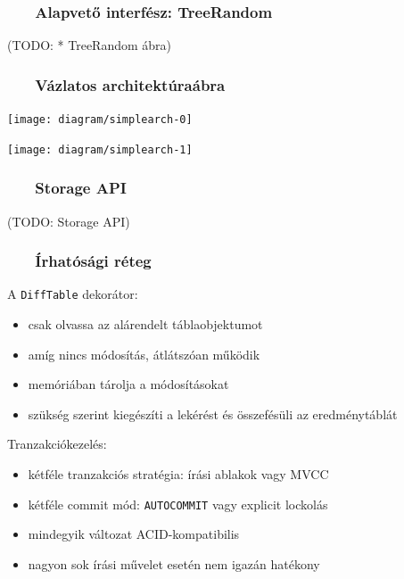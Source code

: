 \documentclass[
]{beamer}
\newcommand{\slidetitle}[2]{\frametitle{{\small #1 ~ \ding{226} ~ } \normalsize \textbf{#2} }}
\begin{document}
\begin{frame}
    \slidetitle{\sectionshorttitle}{Alapvető interfész: TreeRandom}
    
   (TODO: * TreeRandom ábra)
\end{frame}

\begin{frame}
    \slidetitle{\sectionshorttitle}{Vázlatos architektúraábra}
    
    \centering
    
    \begin{overprint}
        \centerline{\texttt{[image: diagram/simplearch-0]}}
        \centerline{\texttt{[image: diagram/simplearch-1]}}
    \end{overprint}
\end{frame}

\begin{frame}
    \slidetitle{\sectionshorttitle}{Storage API}
    
    (TODO: Storage API)
\end{frame}

\begin{frame}
    \slidetitle{\sectionshorttitle}{Írhatósági réteg}
    
    \pause A \texttt{DiffTable} dekorátor:
    
    \begin{itemize}
        \pause \item csak olvassa az alárendelt táblaobjektumot
        \pause \item amíg nincs módosítás, átlátszóan működik
        \pause \item memóriában tárolja a módosításokat
        \pause \item szükség szerint kiegészíti a lekérést és összefésüli az eredménytáblát
    \end{itemize}
    
    \vspace{0.4cm}
    
    \pause Tranzakciókezelés:
    
    \begin{itemize}
        \pause \item kétféle tranzakciós stratégia: írási ablakok vagy MVCC
        \pause \item kétféle commit mód: \texttt{AUTOCOMMIT} vagy explicit lockolás
        \pause \item mindegyik változat ACID-kompatibilis
        \pause \item nagyon sok írási művelet esetén nem igazán hatékony
    \end{itemize}
\end{frame}
\end{document}
